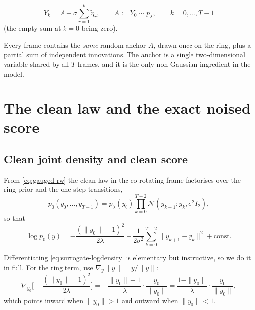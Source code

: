 \documentclass[11pt,a4paper]{article}
\newcommand{\N}{\mathcal{N}}
\begin{document}
\begin{keyresult}
\begin{equation}
 \boxed{\;Y_k=A+\sigma\sum_{r=1}^{k}\widetilde\eta_r,
 \qquad A:=Y_0\sim p_\lambda,\qquad k=0,\ldots,T-1\;}
 \label{eq:rw-anchor}
\end{equation}
(the empty sum at $k=0$ being zero).
\end{keyresult}

Every frame contains the \emph{same} random anchor $A$, drawn once on the ring, plus a
partial sum of independent innovations. The anchor is a single two-dimensional variable shared
by all $T$ frames, and it is the only non-Gaussian ingredient in the model.

\section{The clean law and the exact noised score}\label{sec:surrogate-score}

\subsection{Clean joint density and clean score}

From \eqref{eq:gauged-rw} the clean law in the co-rotating frame factorises over the ring prior
and the one-step transitions,
\begin{equation}
 p_0(y_0,\ldots,y_{T-1})
 =p_\lambda(y_0)\prod_{k=0}^{T-2}\N(y_{k+1};y_k,\sigma^2I_2),
 \label{eq:surrogate-joint}
\end{equation}
so that
\begin{equation}
 \log p_0(y)
 =-\frac{(\|y_0\|-1)^2}{2\lambda}
 -\frac{1}{2\sigma^2}\sum_{k=0}^{T-2}\|y_{k+1}-y_k\|^2+\text{const} .
 \label{eq:surrogate-logdensity}
\end{equation}

Differentiating \eqref{eq:surrogate-logdensity} is elementary but instructive, so we do it in
full. For the ring term, use $\nabla_y\|y\|=y/\|y\|$:
\begin{equation}
 \nabla_{y_0}\Big[-\frac{(\|y_0\|-1)^2}{2\lambda}\Big]
 =-\frac{\|y_0\|-1}{\lambda}\cdot\frac{y_0}{\|y_0\|}
 =\frac{1-\|y_0\|}{\lambda}\cdot\frac{y_0}{\|y_0\|} ,
 \label{eq:ring-score}
\end{equation}
which points inward when $\|y_0\|>1$ and outward when $\|y_0\|<1$.
\end{document}
